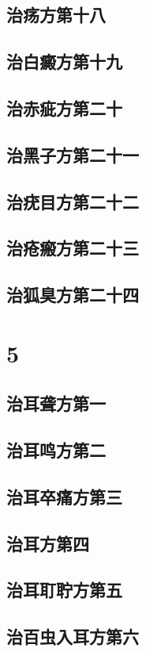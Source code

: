 \documentclass[a4paper,12pt,UTF8,twoside]{ctexbook}
\begin{document}
\chapter{治疡方第十八}
\chapter{治白癜方第十九}
\chapter{治赤疵方第二十}
\chapter{治黑子方第二十一}
\chapter{治疣目方第二十二}
\chapter{治疮瘢方第二十三}
\chapter{治狐臭方第二十四}

\part{5}
\chapter{治耳聋方第一}
\chapter{治耳鸣方第二}
\chapter{治耳卒痛方第三}
\chapter{治耳方第四}
\chapter{治耳耵聍方第五}
\chapter{治百虫入耳方第六}
\end{document}
